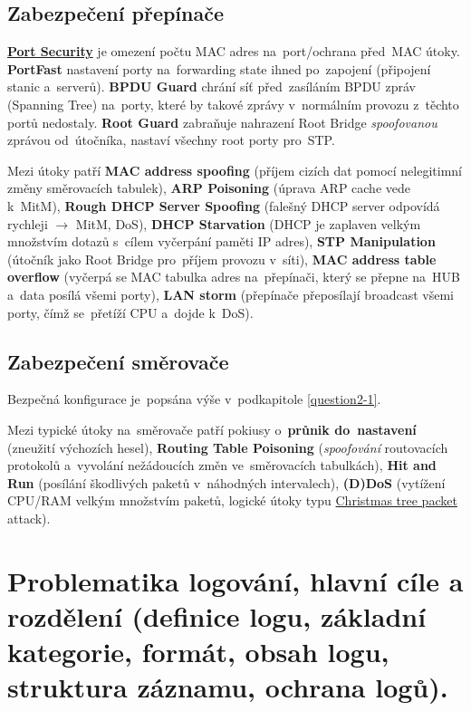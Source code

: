 \subsection{Zabezpečení přepínače}

\textbf{\href{https://en.wikipedia.org/wiki/MAC_filtering}{Port Security}} je omezení počtu MAC adres na~port/ochrana před~MAC útoky. \textbf{PortFast} nastavení porty na~forwarding state ihned po~zapojení (připojení stanic a~serverů). \textbf{BPDU Guard} chrání síť před~zasíláním BPDU zpráv (Spanning Tree) na~porty, které by takové zprávy v~normálním provozu z~těchto portů nedostaly. \textbf{Root Guard} zabraňuje nahrazení Root Bridge \emph{spoofovanou} zprávou od~útočníka, nastaví všechny root porty pro~STP.

Mezi útoky patří \textbf{MAC address spoofing} (příjem cizích dat pomocí nelegitimní změny směrovacích tabulek), \textbf{ARP Poisoning} (úprava ARP cache vede k~MitM), \textbf{Rough DHCP Server Spoofing} (falešný DHCP server odpovídá rychleji $\rightarrow$ MitM, DoS), \textbf{DHCP Starvation} (DHCP je zaplaven velkým množstvím dotazů s~cílem vyčerpání paměti IP adres), \textbf{STP Manipulation} (útočník jako Root Bridge pro~příjem provozu v~síti), \textbf{MAC address table overflow} (vyčerpá se MAC tabulka adres na~přepínači, který se přepne na~HUB a~data posílá všemi porty), \textbf{LAN storm} (přepínače přeposílají broadcast všemi porty, čímž se~přetíží CPU a~dojde k~DoS).

\subsection{Zabezpečení směrovače}

Bezpečná konfigurace je~popsána výše v~podkapitole \ref{question2-1}.

Mezi typické útoky na~směrovače patří pokiusy o~\textbf{průnik do~nastavení} (zneužití výchozích hesel), \textbf{Routing Table Poisoning} (\emph{spoofování} routovacích protokolů a~vyvolání nežádoucích změn ve~směrovacích tabulkách), \textbf{Hit and Run} (posílání škodlivých paketů v~náhodných intervalech), \textbf{(D)DoS} (vytížení CPU/RAM velkým množstvím paketů, logické útoky typu \href{https://en.wikipedia.org/wiki/Christmas_tree_packet}{Christmas tree packet} attack).

\clearpage
\section{Problematika logování, hlavní cíle a rozdělení (definice logu, základní kategorie, formát, obsah logu, struktura záznamu, ochrana logů).}


